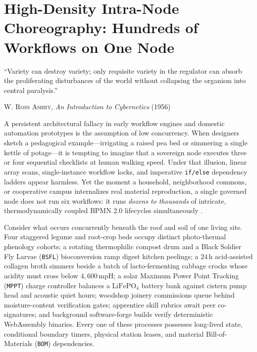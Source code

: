\chapter{High-Density Intra-Node Choreography: Hundreds of Workflows on One Node}
\label{ch:intranode-choreography}

\epigraph{``Variety can destroy variety; only requisite variety in the regulator can absorb the proliferating disturbances of the world without collapsing the organism into central paralysis.''}{\textsc{W. Ross Ashby}, \textit{An Introduction to Cybernetics} (1956)}

A persistent architectural fallacy in early workflow engines and domestic automation prototypes is the
assumption of low concurrency. When designers sketch a pedagogical example---irrigating a raised pea bed
or simmering a single kettle of potage---it is tempting to imagine that a sovereign node executes three or
four sequential checklists at human walking speed. Under that illusion, linear array scans,
single-instance workflow locks, and imperative \texttt{if/else} dependency ladders appear harmless. Yet
the moment a household, neighborhood commons, or cooperative campus internalizes real material
reproduction, a single governed node does not run six workflows: it runs \emph{dozens to thousands} of
intricate, thermodynamically coupled BPMN 2.0 lifecycles simultaneously
\parencite{omg2011bpmn,vanderaalst1998application}.

Consider what occurs concurrently beneath the roof and soil of one living site. Four staggered legume and
root-crop beds occupy distinct photo-thermal phenology cohorts; a rotating thermophilic compost drum and a
Black Soldier Fly Larvae (\texttt{BSFL}) bioconversion ramp digest kitchen peelings; a $24\,\mathrm{h}$
acid-assisted collagen broth simmers beside a batch of lacto-fermenting cabbage crocks whose acidity must
cross below $4{,}600\,\mathrm{mpH}$; a solar Maximum Power Point Tracking (\texttt{MPPT}) charge
controller balances a $\mathrm{LiFePO_4}$ battery bank against cistern pump head and acoustic quiet hours;
woodshop joinery commissions queue behind moisture-content verification gates; apprentice skill rubrics
await peer co-signatures; and background software-forge builds verify deterministic WebAssembly binaries.
Every one of these processes possesses long-lived state, conditional boundary timers, physical station
leases, and material Bill-of-Materials (\texttt{BOM}) dependencies.

